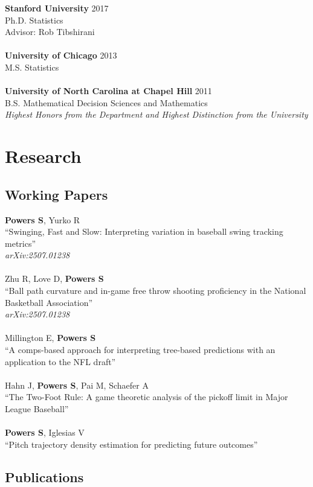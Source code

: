 \documentclass{article}
\begin{document}
{\bf Stanford University} \hfill 2017\\
Ph.D. Statistics\\
Advisor: Rob Tibshirani\\
~\\
{\bf University of Chicago} \hfill 2013\\
M.S. Statistics\\
~\\
{\bf University of North Carolina at Chapel Hill} \hfill 2011\\
B.S. Mathematical Decision Sciences and Mathematics\\
{\it Highest Honors from the Department and Highest Distinction from the University}


\section*{\sc Research}

\subsection*{\sc Working Papers}

{\bf Powers S}, Yurko R\\
``Swinging, Fast and Slow: Interpreting variation in baseball swing tracking metrics''\\
{\it arXiv:2507.01238}\\
~\\
Zhu R, Love D, {\bf Powers S}\\
``Ball path curvature and in-game free throw shooting proficiency in the National Basketball Association''\\
{\it arXiv:2507.01238}\\
~\\
Millington E, {\bf Powers S}\\
``A comps-based approach for interpreting tree-based predictions with an application to the NFL draft''\\
~\\
Hahn J, {\bf Powers S}, Pai M, Schaefer A\\
``The Two-Foot Rule: A game theoretic analysis of the pickoff limit in Major League Baseball''\\
~\\
{\bf Powers S}, Iglesias V\\
``Pitch trajectory density estimation for predicting future outcomes''

\subsection*{\sc Publications}
\end{document}
